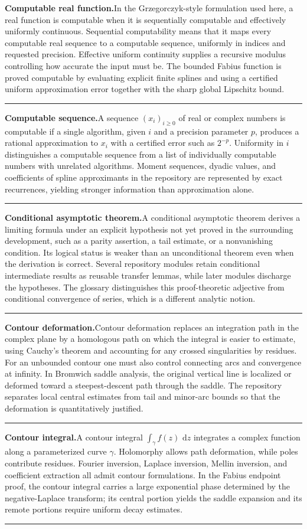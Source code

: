 \documentclass[11pt,oneside]{article}
\newcommand{\dd}{\,\mathrm d}
\newcommand{\glossaryentry}[3]{%
  \par\addvspace{0.95\baselineskip}%
  \phantomsection\hypertarget{gls:#1}{}%
  \noindent\textbf{\large #2.}\enspace #3\par
  \nopagebreak[2]\vspace{0.15\baselineskip}%
  \noindent\color{rulegray}\rule{\linewidth}{0.25pt}\color{black}%
}
\begin{document}
\glossaryentry{computable-real-function}{Computable real function}{In the Grzegorczyk-style formulation used here, a real function is computable when it is sequentially computable and effectively uniformly continuous. Sequential computability means that it maps every computable real sequence to a computable sequence, uniformly in indices and requested precision. Effective uniform continuity supplies a recursive modulus controlling how accurate the input must be. The bounded Fabius function is proved computable by evaluating explicit finite splines and using a certified uniform approximation error together with the sharp global Lipschitz bound.}
\glossaryentry{computable-sequence}{Computable sequence}{A sequence \((x_i)_{i\ge0}\) of real or complex numbers is computable if a single algorithm, given \(i\) and a precision parameter \(p\), produces a rational approximation to \(x_i\) with a certified error such as \(2^{-p}\). Uniformity in \(i\) distinguishes a computable sequence from a list of individually computable numbers with unrelated algorithms. Moment sequences, dyadic values, and coefficients of spline approximants in the repository are represented by exact recurrences, yielding stronger information than approximation alone.}
\glossaryentry{conditional-asymptotic}{Conditional asymptotic theorem}{A conditional asymptotic theorem derives a limiting formula under an explicit hypothesis not yet proved in the surrounding development, such as a parity assertion, a tail estimate, or a nonvanishing condition. Its logical status is weaker than an unconditional theorem even when the derivation is correct. Several repository modules retain conditional intermediate results as reusable transfer lemmas, while later modules discharge the hypotheses. The glossary distinguishes this proof-theoretic adjective from conditional convergence of series, which is a different analytic notion.}
\glossaryentry{contour-deformation}{Contour deformation}{Contour deformation replaces an integration path in the complex plane by a homologous path on which the integral is easier to estimate, using Cauchy's theorem and accounting for any crossed singularities by residues. For an unbounded contour one must also control connecting arcs and convergence at infinity. In Bromwich saddle analysis, the original vertical line is localized or deformed toward a steepest-descent path through the saddle. The repository separates local central estimates from tail and minor-arc bounds so that the deformation is quantitatively justified.}
\glossaryentry{contour-integral}{Contour integral}{A contour integral \(\int_\gamma f(z)\,\dd z\) integrates a complex function along a parameterized curve \(\gamma\). Holomorphy allows path deformation, while poles contribute residues. Fourier inversion, Laplace inversion, Mellin inversion, and coefficient extraction all admit contour formulations. In the Fabius endpoint proof, the contour integral carries a large exponential phase determined by the negative-Laplace transform; its central portion yields the saddle expansion and its remote portions require uniform decay estimates.}
\end{document}
